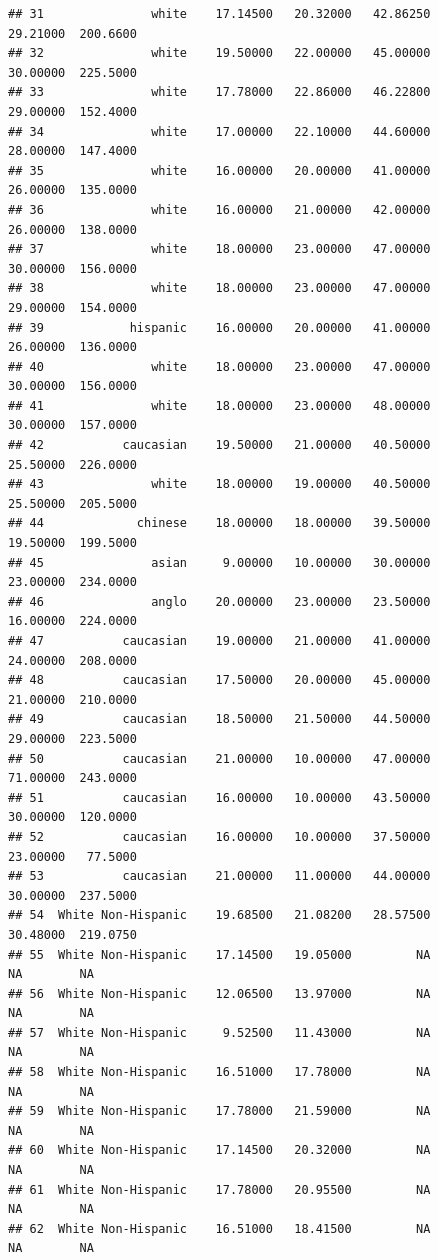 \documentclass[]{article}
\begin{document}
\begin{verbatim}
## 31               white    17.14500   20.32000   42.86250     29.21000  200.6600
## 32               white    19.50000   22.00000   45.00000     30.00000  225.5000
## 33               white    17.78000   22.86000   46.22800     29.00000  152.4000
## 34               white    17.00000   22.10000   44.60000     28.00000  147.4000
## 35               white    16.00000   20.00000   41.00000     26.00000  135.0000
## 36               white    16.00000   21.00000   42.00000     26.00000  138.0000
## 37               white    18.00000   23.00000   47.00000     30.00000  156.0000
## 38               white    18.00000   23.00000   47.00000     29.00000  154.0000
## 39            hispanic    16.00000   20.00000   41.00000     26.00000  136.0000
## 40               white    18.00000   23.00000   47.00000     30.00000  156.0000
## 41               white    18.00000   23.00000   48.00000     30.00000  157.0000
## 42           caucasian    19.50000   21.00000   40.50000     25.50000  226.0000
## 43               white    18.00000   19.00000   40.50000     25.50000  205.5000
## 44             chinese    18.00000   18.00000   39.50000     19.50000  199.5000
## 45               asian     9.00000   10.00000   30.00000     23.00000  234.0000
## 46               anglo    20.00000   23.00000   23.50000     16.00000  224.0000
## 47           caucasian    19.00000   21.00000   41.00000     24.00000  208.0000
## 48           caucasian    17.50000   20.00000   45.00000     21.00000  210.0000
## 49           caucasian    18.50000   21.50000   44.50000     29.00000  223.5000
## 50           caucasian    21.00000   10.00000   47.00000     71.00000  243.0000
## 51           caucasian    16.00000   10.00000   43.50000     30.00000  120.0000
## 52           caucasian    16.00000   10.00000   37.50000     23.00000   77.5000
## 53           caucasian    21.00000   11.00000   44.00000     30.00000  237.5000
## 54  White Non-Hispanic    19.68500   21.08200   28.57500     30.48000  219.0750
## 55  White Non-Hispanic    17.14500   19.05000         NA           NA        NA
## 56  White Non-Hispanic    12.06500   13.97000         NA           NA        NA
## 57  White Non-Hispanic     9.52500   11.43000         NA           NA        NA
## 58  White Non-Hispanic    16.51000   17.78000         NA           NA        NA
## 59  White Non-Hispanic    17.78000   21.59000         NA           NA        NA
## 60  White Non-Hispanic    17.14500   20.32000         NA           NA        NA
## 61  White Non-Hispanic    17.78000   20.95500         NA           NA        NA
## 62  White Non-Hispanic    16.51000   18.41500         NA           NA        NA

\end{verbatim}
\end{document}
